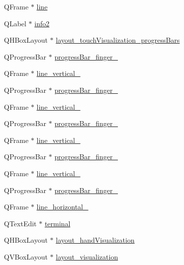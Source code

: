 \begin{DoxyCompactItemize}
\item 
Q\+Frame $\ast$ \hyperlink{class_ui___main_window_a16e802a7ebd4beb9d8aba858565e51b3}{line}
\item 
Q\+Label $\ast$ \hyperlink{class_ui___main_window_abdbd7b0c4b53588bbaa1c9d8a0b0049c}{info2}
\item 
Q\+H\+Box\+Layout $\ast$ \hyperlink{class_ui___main_window_aa52a9abae97e4436e08e3eaf7f1fa68d}{layout\+\_\+touch\+Visualization\+\_\+progress\+Bars}
\item 
Q\+Progress\+Bar $\ast$ \hyperlink{class_ui___main_window_a2aefcebd9b0885300e637de8adbc398f}{progress\+Bar\+\_\+finger\+\_}
\item 
Q\+Frame $\ast$ \hyperlink{class_ui___main_window_ad09cc9535973ae3277d763ba26c0bde7}{line\+\_\+vertical\+\_}
\item 
Q\+Progress\+Bar $\ast$ \hyperlink{class_ui___main_window_af815818379db0dd0e7151b6b10013a14}{progress\+Bar\+\_\+finger\+\_}
\item 
Q\+Frame $\ast$ \hyperlink{class_ui___main_window_a8b589badc050f11ab46de57f00be1f32}{line\+\_\+vertical\+\_}
\item 
Q\+Progress\+Bar $\ast$ \hyperlink{class_ui___main_window_a912825e43db773a4f0230bb7a0e0a08f}{progress\+Bar\+\_\+finger\+\_}
\item 
Q\+Frame $\ast$ \hyperlink{class_ui___main_window_ae03f2231cd6b20e5a73a43c1c9bd1db5}{line\+\_\+vertical\+\_}
\item 
Q\+Progress\+Bar $\ast$ \hyperlink{class_ui___main_window_a0d16a196173b91ce85601923872a0c91}{progress\+Bar\+\_\+finger\+\_}
\item 
Q\+Frame $\ast$ \hyperlink{class_ui___main_window_adefda44fccc21fc77d56e7d43b2953a1}{line\+\_\+vertical\+\_}
\item 
Q\+Progress\+Bar $\ast$ \hyperlink{class_ui___main_window_a4c42ee1f656c35c709c510d699e9ef10}{progress\+Bar\+\_\+finger\+\_}
\item 
Q\+Frame $\ast$ \hyperlink{class_ui___main_window_a49d0f93de730e6e6f59bfae9362db1ad}{line\+\_\+horizontal\+\_}
\item 
Q\+Text\+Edit $\ast$ \hyperlink{class_ui___main_window_a73c8fc10451a68c0b919baf5674e9100}{terminal}
\item 
Q\+H\+Box\+Layout $\ast$ \hyperlink{class_ui___main_window_a9a4d3580a18ecf8798c160016eae070a}{layout\+\_\+hand\+Visualization}
\item 
Q\+V\+Box\+Layout $\ast$ \hyperlink{class_ui___main_window_a10ac06daf3f3143ca8dce61b1c7ce678}{layout\+\_\+visualization}

\end{DoxyCompactItemize}
